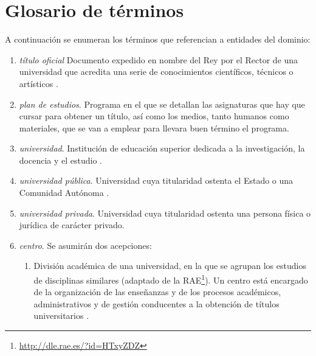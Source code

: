 \chapter{Glosario de términos}

A continuación se enumeran los términos que referencian a entidades del dominio:

\begin{enumerate}

    \item \emph{título oficial} \label{def_titulo_documento} Documento expedido
        en nombre del Rey por el Rector de una universidad \cite[artículo
        35]{leyUniversidades} que acredita una serie de conocimientos
        científicos, técnicos o artísticos \cite[artículo
        33]{leyUniversidades}.

    \item \emph{plan de estudios}. Programa en el que se detallan las
        asignaturas que hay que cursar para obtener un título, así como los
        medios, tanto humanos como materiales, que se van a emplear para
        llevara buen término el programa.

    \item \emph{universidad}. Institución de educación superior dedicada a la
        investigación, la docencia y el estudio \cite[articulo 1, apartado 
        1]{leyUniversidades}.

    \item \emph{universidad pública}. Universidad cuya titularidad ostenta el Estado o
        una Comunidad Autónoma \cite[artículo 3]{rdUniversidadesPrivadas}.

    \item \emph{universidad privada}. Universidad cuya titularidad ostenta una persona
        física o jurídica de carácter privado\cite[artículo
        3]{rdUniversidadesPrivadas}.

    \item \emph{centro}. Se asumirán dos acepciones:

        \begin{enumerate}

            \item \label{centro_div} División académica de una universidad, en la que se agrupan
                los estudios de disciplinas similares (adaptado de la
                RAE\footnote{\url{http://dle.rae.es/?id=HTxyZDZ}}). Un centro
                está encargado de la organización de las enseñanzas y de los
                procesos académicos, administrativos y de gestión conducentes a
                la obtención de títulos universitarios \cite[artículo 8]{leyUniversidades}.


\end{enumerate}
\end{enumerate}
